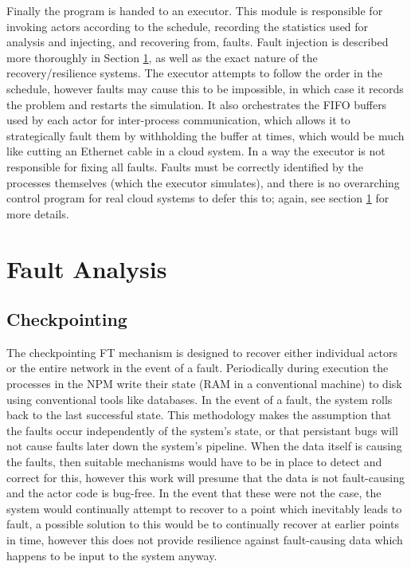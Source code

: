 Finally the program is handed to an executor.
This module is responsible for invoking actors according to the schedule, recording the statistics used for analysis and injecting, and recovering from, faults.
Fault injection is described more thoroughly in Section \ref{secSystemFault}, as well as the exact nature of the recovery/resilience systems.
The executor attempts to follow the order in the schedule, however faults may cause this to be impossible, in which case it records the problem and restarts the simulation.
It also orchestrates the FIFO buffers used by each actor for inter-process communication, which allows it to strategically fault them by withholding the buffer at times, which would be much like cutting an Ethernet cable in a cloud system.
In a way the executor is not responsible for fixing all faults.
Faults must be correctly identified by the processes themselves (which the executor simulates), and there is no overarching control program for real cloud systems to defer this to; again, see section \ref{secSystemFault} for more details.

\section{Fault Analysis}
\label{secSystemFault}
\subsection{Checkpointing}

The checkpointing FT mechanism is designed to recover either individual actors or the entire network in the event of a fault.
Periodically during execution the processes in the NPM write their state (RAM in a conventional machine) to disk using conventional tools like databases.
In the event of a fault, the system rolls back to the last successful state.
This methodology makes the assumption that the faults occur independently of the system's state, or that persistant bugs will not cause faults later down the system's pipeline.
When the data itself is causing the faults, then suitable mechanisms would have to be in place to detect and correct for this, however this work will presume that the data is not fault-causing and the actor code is bug-free.
In the event that these were not the case, the system would continually attempt to recover to a point which inevitably leads to fault, a possible solution to this would be to continually recover at earlier points in time, however this does not provide resilience against fault-causing data which happens to be input to the system anyway.

